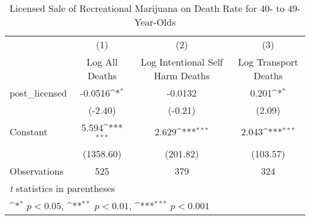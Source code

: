 \begin{table}[htbp]\centering
\def\sym#1{\ifmmode^{#1}\else\(^{#1}\)\fi}
\caption{Licensed Sale of Recreational Marijuana on Death Rate for 40- to 49-Year-Olds}
\begin{tabular}{l*{3}{c}}
\hline\hline
                    &\multicolumn{1}{c}{(1)}&\multicolumn{1}{c}{(2)}&\multicolumn{1}{c}{(3)}\\
                    &\multicolumn{1}{c}{Log All Deaths}&\multicolumn{1}{c}{Log Intentional Self Harm Deaths}&\multicolumn{1}{c}{Log Transport Deaths}\\
\hline
post\_licensed       &     -0.0516\sym{*}  &     -0.0132         &       0.201\sym{*}  \\
                    &     (-2.40)         &     (-0.21)         &      (2.09)         \\
[1em]
Constant            &       5.594\sym{***}&       2.629\sym{***}&       2.043\sym{***}\\
                    &   (1358.60)         &    (201.82)         &    (103.57)         \\
\hline
Observations        &         525         &         379         &         324         \\
\hline\hline
\multicolumn{4}{l}{\footnotesize \textit{t} statistics in parentheses}\\
\multicolumn{4}{l}{\footnotesize \sym{*} \(p<0.05\), \sym{**} \(p<0.01\), \sym{***} \(p<0.001\)}\\
\end{tabular}
\end{table}
